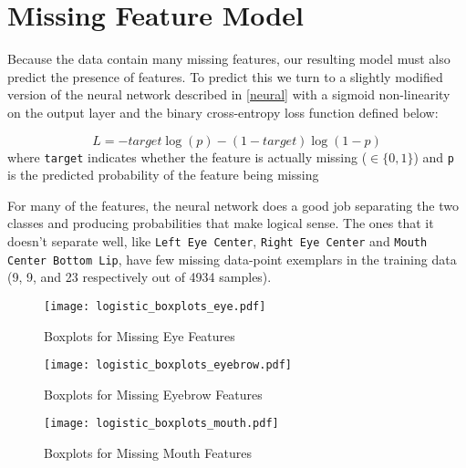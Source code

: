 \documentclass{article}
\begin{document}
\section{Missing Feature Model}\label{missing}

Because the data contain many missing features, our resulting model must also predict the presence of features. To predict this we turn to a slightly modified version of the neural network described in \ref{neural} with a sigmoid non-linearity on the output layer and the binary cross-entropy loss function defined below:

\[\label{eq:bin_cross}
 L = -target \log(p) - (1 - target) \log(1 - p)
\]
where \texttt{target} indicates whether the feature is actually missing ($\in \{0,1\}$) and \texttt{p} is the predicted probability of the feature being missing

For many of the features, the neural network does a good job separating the two classes and producing probabilities that make logical sense.  The ones that it doesn't separate well, like \texttt{Left Eye Center}, \texttt{Right Eye Center} and \texttt{Mouth Center Bottom Lip}, have few missing data-point exemplars in the training data (9, 9, and 23 respectively out of 4934 samples).

\begin{figure}[!ht]
  \centering
  \caption{Boxplots for Missing Eye Features}
  \texttt{[image: logistic\_boxplots\_eye.pdf]}
  \label{fig:logistic_boxplots_eye}
\end{figure}

\begin{figure}[!ht]
  \centering
  \caption{Boxplots for Missing Eyebrow Features}
  \texttt{[image: logistic\_boxplots\_eyebrow.pdf]}
  \label{fig:logistic_boxplots_eyebrow}
\end{figure}

\begin{figure}[!ht]
  \centering
  \caption{Boxplots for Missing Mouth Features}
  \texttt{[image: logistic\_boxplots\_mouth.pdf]}
  \label{fig:logistic_boxplots_mouth}
\end{figure}

\end{document}
